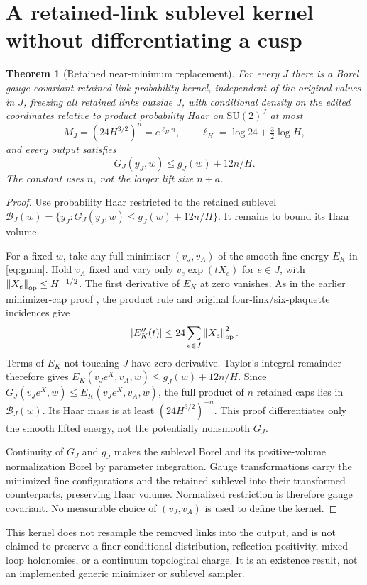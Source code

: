 \documentclass[11pt]{article}
\newtheorem{theorem}{Theorem}[section]
\theoremstyle{definition}
\theoremstyle{remark}
\newcommand{\SU}{\mathrm{SU}(2)}
\newcommand{\norm}[1]{\left\lVert#1\right\rVert}
\begin{document}
\section{A retained-link sublevel kernel without differentiating a cusp}
\begin{theorem}[Retained near-minimum replacement]\label{thm:kernel}
For every $J$ there is a Borel gauge-covariant retained-link probability
kernel, independent of the original values in $J$, freezing all retained
links outside $J$, with conditional density on the edited coordinates
relative to product probability Haar on $\SU^J$ at most
\begin{equation}
 M_J=(24H^{3/2})^n=e^{\ell_H n},\qquad
 \ell_H=\log24+\tfrac32\log H,
 \label{eq:density}
\end{equation}
and every output satisfies
\begin{equation}
 G_J(y_J,w)\le g_J(w)+12n/H.
 \label{eq:kernelenergy}
\end{equation}
The constant uses $n$, not the larger lift size $n+a$.
\end{theorem}
\begin{proof}
Use probability Haar restricted to the retained sublevel
$\mathcal B_J(w)=\{y_J:G_J(y_J,w)\le g_J(w)+12n/H\}$.
It remains to bound its Haar volume.

For a fixed $w$, take any full minimizer $(v_J,v_A)$ of the smooth
fine energy $E_K$ in \eqref{eq:gmin}. Hold $v_A$ fixed and vary only
$v_e\exp(tX_e)$ for $e\in J$, with $\norm{X_e}_{\rm op}\le H^{-1/2}$.
The first derivative of $E_K$ at zero vanishes. As in the earlier
minimizer-cap proof \cite{rough}, the product rule and original
four-link/six-plaquette incidences give
\[
 |E_K''(t)|\le24\sum_{e\in J}\norm{X_e}_{\rm op}^2.
\]
Terms of $E_K$ not touching $J$ have zero derivative. Taylor's integral
remainder therefore gives
$E_K(v_Je^X,v_A,w)\le g_J(w)+12n/H$.
Since $G_J(v_Je^X,w)\le E_K(v_Je^X,v_A,w)$, the full product of $n$
retained caps lies in $\mathcal B_J(w)$. Its Haar mass is at least
$(24H^{3/2})^{-n}$. This proof differentiates only the smooth lifted
energy, not the potentially nonsmooth $G_J$.

Continuity of $G_J$ and $g_J$ makes the sublevel Borel and its
positive-volume normalization Borel by parameter integration.
Gauge transformations carry the minimized fine configurations and the
retained sublevel into their transformed counterparts, preserving Haar
volume. Normalized restriction is therefore gauge covariant. No
measurable choice of $(v_J,v_A)$ is used to define the kernel.
\end{proof}
This kernel does not resample the removed links into the output, and is
not claimed to preserve a finer conditional distribution, reflection
positivity, mixed-loop holonomies, or a continuum topological charge.
It is an existence result, not an implemented generic minimizer or
sublevel sampler.
\end{document}

